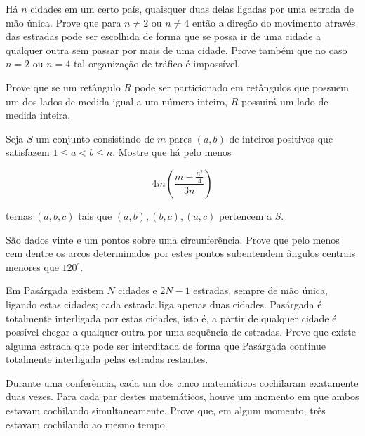 \begin{questao}
  Há $n$ cidades em um certo país, quaisquer duas delas
  ligadas por uma estrada de mão única. Prove que para $n \not = 2$
  ou $n \not = 4$ então a direção do movimento através das estradas
  pode ser escolhida de forma que se possa ir de uma cidade a qualquer
  outra sem passar por mais de uma cidade. Prove também que no caso
  $n = 2$ ou $n = 4$ tal organização de tráfico é impossível.
\end{questao}

\begin{questao}
  Prove que se um retângulo $R$ pode ser particionado em
  retângulos que possuem um dos lados de medida igual a um número
  inteiro, $R$ possuirá um lado de medida inteira.
\end{questao}

\begin{questao}
  Seja $S$ um conjunto consistindo de $m$ pares
  $(a,b)$ de inteiros positivos que satisfazem $1 \leq a < b \leq
  n$. Mostre que há pelo menos

  $$ 4m \left( \frac{m-\frac{n^2}{4}}{3n} \right) $$

  ternas $(a,b,c)$ tais que $(a,b),(b,c),(a,c)$ pertencem a $S$.
\end{questao}

\begin{questao}
  São dados vinte e um pontos sobre uma
  circunferência. Prove que pelo menos cem dentre os arcos
  determinados por estes pontos subentendem ângulos centrais menores
  que $120^\circ$.
\end{questao}

\begin{questao}
  Em Pasárgada existem $N$ cidades e $2N-1$ estradas,
  sempre de mão única, ligando estas cidades; cada estrada liga apenas
  duas cidades. Pasárgada é totalmente interligada por estas cidades,
  isto é, a partir de qualquer cidade é possível chegar a qualquer
  outra por uma sequência de estradas. Prove que existe alguma estrada
  que pode ser interditada de forma que Pasárgada continue totalmente
  interligada pelas estradas restantes.
\end{questao}

\begin{questao}
  Durante uma conferência, cada um dos cinco matemáticos
  cochilaram exatamente duas vezes. Para cada par destes matemáticos,
  houve um momento em que ambos estavam cochilando
  simultaneamente. Prove que, em algum momento, três estavam
  cochilando ao mesmo tempo.
\end{questao}


